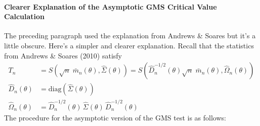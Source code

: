 \documentclass[12pt]{article}
\begin{document}
\paragraph{Clearer Explanation of the Asymptotic GMS Critical Value Calculation}
The preceding paragraph used the explanation from Andrews \& Soares but it's a little obscure. 
Here's a simpler and clearer explanation.
Recall that the statistics from Andrews \& Soares (2010) satisfy
\begin{align*}
  T_n &= S\left( \sqrt{n}\; \bar{m}_n(\theta), \widehat{\Sigma}(\theta) \right) = S\left( \widehat{D}_n^{-1/2}(\theta) \sqrt{n}\; \bar{m}_n(\theta), \widehat{\Omega}_n(\theta) \right)\\
  \widehat{D}_n(\theta) &= \mbox{diag}\left( \widehat{\Sigma}\left( \theta \right) \right)\\
  \widehat{\Omega}_n(\theta) &= \widehat{D}_n^{-1/2}(\theta)\, \widehat{\Sigma}(\theta)\, \widehat{D}_n^{-1/2}(\theta)
\end{align*}
The procedure for the asymptotic version of the GMS test is as follows:
\end{document}
